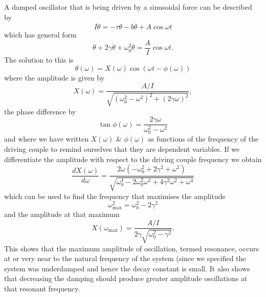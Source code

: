 \documentclass[12pt]{article}
\begin{document}
A damped oscillator that is being driven by a sinusoidal force can be described by
\begin{equation}
I\ddot{\theta}=-\tau\theta-b\dot{\theta}+A\cos{\omega t}
\end{equation}
which has general form
\begin{equation}
\ddot{\theta}+2\gamma\dot{\theta}+\omega_0^2\theta=\frac{A}{I}\cos{\omega t}.
\end{equation}
The solution to this is
\begin{equation}
\theta(\omega)=X(\omega)\cos\left(\omega t-\phi(\omega)\right)
\end{equation}
where the amplitude is given by
\begin{equation}
X(\omega)=\frac{A/I}{\sqrt{\left(\omega_0^2-\omega^2\right)^2+\left(2\gamma\omega\right)^2}},
\label{drivenAmplitude}
\end{equation}
the phase difference by
\begin{equation}
\tan\phi(\omega)=\frac{2\gamma\omega}{\omega_0^2-\omega^2}
\end{equation}
and where we have written $X(\omega)$ \& $\phi(\omega)$ as functions of the frequency of the driving couple to remind ourselves that they are dependent variables. If we differentiate the amplitude with respect to the driving couple frequency we obtain
\begin{equation}
\frac{dX(\omega)}{d\omega}=\frac{2\omega\left(-\omega_0^2+2\gamma^2+\omega^2\right)}{\sqrt{\omega_0^4-2\omega_0^2\omega^2+4\gamma^2\omega^2+\omega^4}}
\end{equation}
which can be used to find the frequency that maximises the amplitude
\begin{equation}
\omega_\text{max}^2=\omega_0^2-2\gamma^2
\end{equation}
and the amplitude at that maximum
\begin{equation}
X(\omega_\text{max})=\frac{A/I}{2\gamma\sqrt{\omega_0^2-\gamma^2}}.
\label{maxAmplitude}
\end{equation}
This shows that the maximum amplitude of oscillation, termed resonance, occurs at or very near to the natural frequency of the system (since we specified the system was underdamped and hence the decay constant is small. It also shows that decreasing the damping should produce greater amplitude oscillations at that resonant frequency.
\label{dampingEffectOnGraph}
\end{document}
